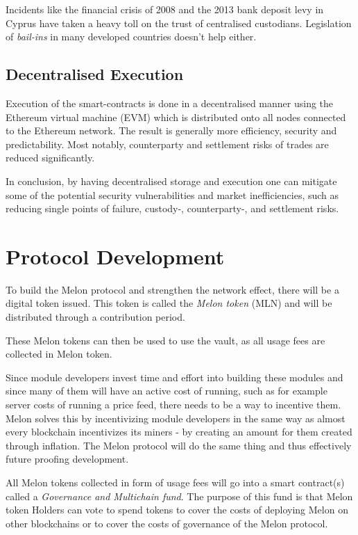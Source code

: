 \documentclass[9pt,oneside]{amsart}
\theoremstyle{plain}
\begin{document}
\begin{multicols}{2}
Incidents like the financial crisis of 2008 and the 2013 bank deposit levy in Cyprus have taken a heavy toll on the trust of centralised custodians. Legislation of \textit{bail-ins} in many developed countries doesn't help either\cite{bailinsch}\cite{bailinseu}.

\subsection{Decentralised Execution}

Execution of the smart-contracts is done in a decentralised manner using the Ethereum virtual machine (EVM) which is distributed onto all nodes connected to the Ethereum network. The result is generally more efficiency, security and predictability. Most notably, counterparty and settlement risks of trades are reduced significantly.

In conclusion, by having decentralised storage and execution one can mitigate some of the potential security vulnerabilities and market inefficiencies, such as reducing single points of failure, custody-, counterparty-, and settlement risks.

\section{Protocol Development}\label{sec:protocoldevelopment}

To build the Melon protocol and strengthen the network effect, there will be a digital token issued. This token is called the \textit{Melon token} (MLN) and will be distributed through a contribution period.

These Melon tokens can then be used to use the vault, as all usage fees are collected in Melon token. 

Since module developers invest time and effort into building these modules and since many of them will have an active cost of running, such as for example server costs of running a price feed, there needs to be a way to incentive them. Melon solves this by incentivizing module developers in the same way as almost every blockchain incentivizes its miners - by creating an amount for them created through inflation. The Melon protocol will do the same thing and thus effectively future proofing development.

All Melon tokens collected in form of usage fees will go into a smart contract(s) called a \textit{Governance and Multichain fund}. The purpose of this fund is that Melon token Holders can vote to spend tokens to cover the costs of deploying Melon on other blockchains or to cover the costs of governance of the Melon protocol.


\end{multicols}
\end{document}
